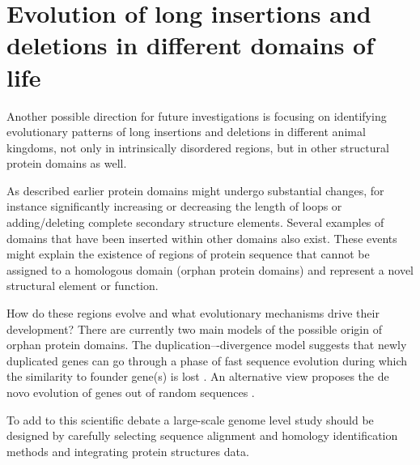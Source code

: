 \documentclass[11pt, a4paper,oneside]{report}
\begin{document}
 \section{Evolution of long insertions and deletions in different domains of life}
 Another possible direction for future investigations is focusing on identifying evolutionary patterns of long insertions and deletions in different animal kingdoms, not only in intrinsically disordered regions, but in other structural protein domains as well.  
 
 As described earlier protein domains might undergo substantial changes, for instance significantly increasing or decreasing the length of loops or adding/deleting complete secondary structure elements. Several examples of domains that have been inserted within other domains also exist. These events might explain the existence of regions of protein sequence that cannot be assigned to a homologous domain (orphan protein domains) and represent a novel structural element or function. 
 
 How do these regions evolve and what evolutionary mechanisms drive their development? There are currently two main models of the possible origin of orphan protein domains. The  duplication–-divergence model suggests that newly duplicated genes can go through a phase of fast sequence evolution during which the similarity to founder gene(s) is lost \cite{Orengo2005}. An alternative view proposes the de novo evolution of genes out of random sequences \cite{Tautz2011}. 
 
  To add to this scientific debate a large-scale genome level study should be designed by carefully selecting sequence alignment and homology identification methods and integrating protein structures data. 



\end{document}
